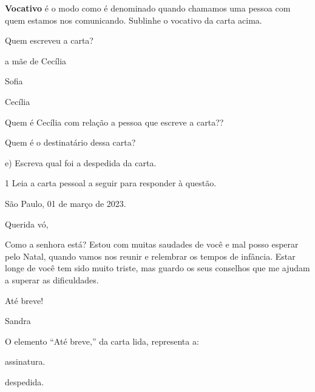 \begin{escolha}
\item \textbf{Vocativo} é o modo como é denominado quando chamamos uma
pessoa com quem estamos nos comunicando. Sublinhe o vocativo da carta
acima.

\item Quem escreveu a carta?

\begin{boxlist}
\boxitem[\rosa{X}] a mãe de Cecília 

\boxitem[] Sofia

\boxitem[] Cecília
\end{boxlist}

\item Quem é Cecília com relação a pessoa que escreve a carta??


\item Quem é o destinatário dessa carta?



e) Escreva qual foi a despedida da carta. 



\num{1} Leia a carta pessoal a seguir para responder à questão.


\begin{mdframed}[linewidth=10pt,linecolor=salmao!20,backgroundcolor=salmao!20,roundcorner=20pt]
São Paulo, 01 de março de 2023.

Querida vó,

Como a senhora está? Estou com muitas saudades de você e mal posso
esperar pelo Natal, quando vamos nos reunir e relembrar os tempos de
infância. Estar longe de você tem sido muito triste, mas guardo os seus
conselhos que me ajudam a superar as dificuldades.

\begin{flushright}
Até breve!

Sandra
\end{flushright}
\end{mdframed}

O elemento ``Até breve,'' da carta lida, representa a:

\begin{escolha}
\item assinatura.

\item despedida.


\end{escolha}
\end{escolha}
